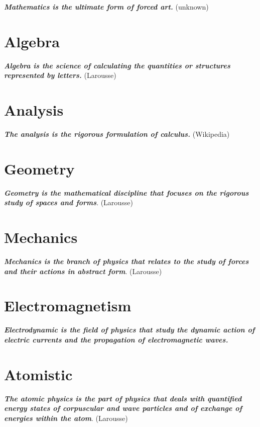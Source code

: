 \documentclass[12pt,a4paper,twoside,openright]{report}
\theoremstyle{definition}
\theoremstyle{itexmp}
\numberwithin{equation}{section}
\begin{document}
	\textit{\textbf{Mathematics is the ultimate form of forced art.}} (unknown)
	\minitoc
	
	
	
   \chapter{Algebra}

	\textit{\textbf{Algebra is the science of calculating the quantities or structures represented by letters.}} (Larousse)
	\minitoc
	
	
		
   \chapter{Analysis}

	\textit{\textbf{The analysis is the rigorous formulation of calculus.}} (Wikipedia)
	\minitoc
	\pagebreak
	
		
    \chapter{Geometry}

	\textit{\textbf{Geometry is the mathematical discipline that focuses on the rigorous study of spaces and forms}}. (Larousse)
	\minitoc
	\pagebreak
	
	
   \chapter{Mechanics}

	\textit{\textbf{Mechanics is the branch of physics that relates to the study of forces and their actions in abstract form}}. (Larousse)
	\minitoc
	
	
   \chapter{Electromagnetism}   

	\textit{\textbf{Electrodynamic is the field of physics that study the dynamic action of electric currents and the propagation of electromagnetic waves.}}
	\minitoc
	\pagebreak
	

   \chapter{Atomistic}
   \label{atomistic}
	\textit{\textbf{The atomic physics is the part of physics that deals with quantified energy states of corpuscular and wave particles and of exchange of energies within the atom}}. (Larousse)
	\minitoc
	\pagebreak
	
	
\end{document}
